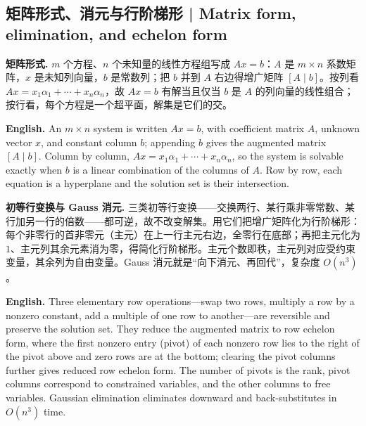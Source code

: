 \documentclass[UTF8,11pt,a4paper]{ctexart}
\newcommand{\EN}[1]{\par\noindent\textbf{English.} #1\par}
\begin{document}
\subsection{矩阵形式、消元与行阶梯形 | Matrix form, elimination, and echelon form}
\noindent\textbf{矩阵形式.} $m$ 个方程、$n$ 个未知量的线性方程组写成 $Ax=b$：$A$ 是 $m\times n$ 系数矩阵，$x$ 是未知列向量，$b$ 是常数列；把 $b$ 并到 $A$ 右边得增广矩阵 $[A\mid b]$。按列看 $Ax=x_1\alpha_1+\cdots+x_n\alpha_n$，故 $Ax=b$ 有解当且仅当 $b$ 是 $A$ 的列向量的线性组合；按行看，每个方程是一个超平面，解集是它们的交。
\EN{An $m\times n$ system is written $Ax=b$, with coefficient matrix $A$, unknown vector $x$, and constant column $b$; appending $b$ gives the augmented matrix $[A\mid b]$. Column by column, $Ax=x_1\alpha_1+\cdots+x_n\alpha_n$, so the system is solvable exactly when $b$ is a linear combination of the columns of $A$. Row by row, each equation is a hyperplane and the solution set is their intersection.}
\noindent\textbf{初等行变换与 Gauss 消元.} 三类初等行变换——交换两行、某行乘非零常数、某行加另一行的倍数——都可逆，故不改变解集。用它们把增广矩阵化为行阶梯形：每个非零行的首非零元（主元）在上一行主元右边，全零行在底部；再把主元化为 $1$、主元列其余元素消为零，得简化行阶梯形。主元个数即秩，主元列对应受约束变量，其余列为自由变量。Gauss 消元就是“向下消元、再回代”，复杂度 $O(n^3)$。
\EN{Three elementary row operations---swap two rows, multiply a row by a nonzero constant, add a multiple of one row to another---are reversible and preserve the solution set. They reduce the augmented matrix to row echelon form, where the first nonzero entry (pivot) of each nonzero row lies to the right of the pivot above and zero rows are at the bottom; clearing the pivot columns further gives reduced row echelon form. The number of pivots is the rank, pivot columns correspond to constrained variables, and the other columns to free variables. Gaussian elimination eliminates downward and back-substitutes in $O(n^3)$ time.}
\end{document}
